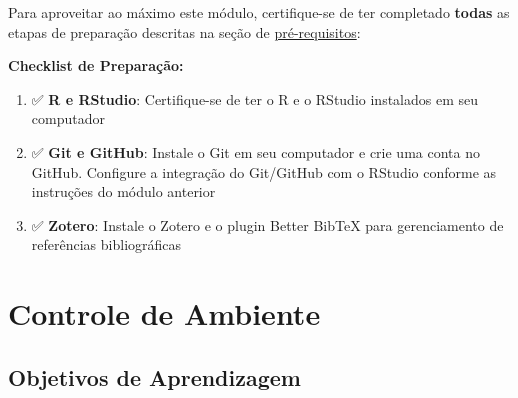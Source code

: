 \documentclass[
  a4paper,
]{book}
\providecommand{\tightlist}{%
  \setlength{\itemsep}{0pt}\setlength{\parskip}{0pt}}\usepackage{longtable,booktabs,array}
\newcommand{\emojitext}[1]{{\emoji #1}}
\begin{document}
\begin{tcolorbox}[enhanced jigsaw, colback=white, toptitle=1mm, opacityback=0, left=2mm, rightrule=.15mm, title=\textcolor{quarto-callout-important-color}{\faExclamation}\hspace{0.5em}{Pré-requisitos}, coltitle=black, opacitybacktitle=0.6, breakable, toprule=.15mm, bottomtitle=1mm, titlerule=0mm, bottomrule=.15mm, arc=.35mm, leftrule=.75mm, colframe=quarto-callout-important-color-frame, colbacktitle=quarto-callout-important-color!10!white]

Para aproveitar ao máximo este módulo, certifique-se de ter completado
\textbf{todas} as etapas de preparação descritas na seção de
\href{https://phdpablo.github.io/curso-open-science/00-prework.html}{pré-requisitos}:

\vspace{10pt}

\textbf{Checklist de Preparação:}

\vspace{10pt}

\begin{enumerate}
\def\labelenumi{\arabic{enumi}.}
\tightlist
\item
  \emojitext{✅} \textbf{R e RStudio}: Certifique-se de ter o R e o
  RStudio instalados em seu computador
\item
  \emojitext{✅} \textbf{Git e GitHub}: Instale o Git em seu computador
  e crie uma conta no GitHub. Configure a integração do Git/GitHub com o
  RStudio conforme as instruções do módulo anterior
\item
  \emojitext{✅} \textbf{Zotero}: Instale o Zotero e o plugin Better
  BibTeX para gerenciamento de referências bibliográficas
\end{enumerate}

\end{tcolorbox}


\chapter{Controle de Ambiente}\label{sec-docker}

\section{Objetivos de Aprendizagem}\label{objetivos-de-aprendizagem-6}
\end{document}
